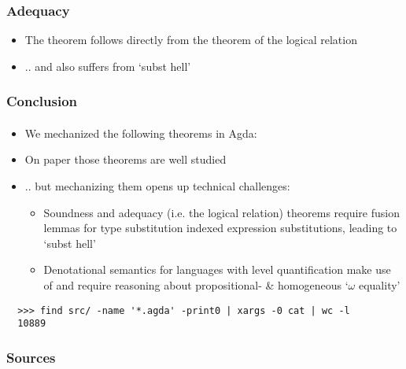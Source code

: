 \documentclass[dvipsnames,aspectratio=169,pdftex]{beamer}
\begin{document}
\begin{frame}[fragile]
  \frametitle{Adequacy}
  \FundamentalAdequacyType
  \vspace{-12.5mm} 
  \FundamentalAdequacyBody
  \begin{itemize}
    \item The  theorem follows directly from
      the  theorem of the logical relation
    \item .. and also suffers from `subst hell'
  \end{itemize}
\end{frame}


\begin{frame}[fragile]
  \frametitle{Conclusion}
  \framesubtitle{}
  \begin{itemize}
    \item We mechanized the following theorems in Agda: 
  \end{itemize}
  \begin{itemize} 
    \item On paper those theorems are well studied
    \item .. but mechanizing them opens up technical challenges:
    \begin{itemize} 
      \item Soundness and adequacy (i.e. the logical relation) theorems require fusion lemmas for type substitution indexed expression substitutions, leading to `subst hell'
      \item Denotational semantics for languages with level quantification make use of  and require reasoning about propositional- \& homogeneous `$\omega$ equality'
    \end{itemize}
  \end{itemize}
  \begin{verbatim} 
  >>> find src/ -name '*.agda' -print0 | xargs -0 cat | wc -l
  10889
  \end{verbatim}
\end{frame}

\begin{frame}[fragile]
  \frametitle{Sources}  
   
  
\end{frame}
\end{document}
